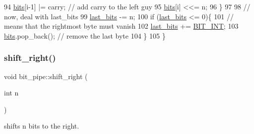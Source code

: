\begin{DoxyCode}
94       \hyperlink{classbit__pipe_a86f38af1e9736b053728033490476b50}{bits}[i-1] |= carry; \textcolor{comment}{// add carry to the left guy}
95     \hyperlink{classbit__pipe_a86f38af1e9736b053728033490476b50}{bits}[i] <<= n; 
96   \}
97 
98   \textcolor{comment}{// now, deal with last\_bits}
99   \hyperlink{classbit__pipe_a0f3e84b02751803adaab499b5dad86fe}{last\_bits} -= n;
100   \textcolor{keywordflow}{if} (\hyperlink{classbit__pipe_a0f3e84b02751803adaab499b5dad86fe}{last\_bits} <= 0)\{
101     \textcolor{comment}{// means that the rightmost byte must vanish}
102     \hyperlink{classbit__pipe_a0f3e84b02751803adaab499b5dad86fe}{last\_bits} += \hyperlink{bitstream_8h_afcadf5aa65c5159bfb96c4d82ebc0a5d}{BIT\_INT};
103     \hyperlink{classbit__pipe_a86f38af1e9736b053728033490476b50}{bits}.pop\_back(); \textcolor{comment}{// remove the last byte}
104   \}
105 \}
\end{DoxyCode}
\mbox{\label{classbit__pipe_a341a1f62d728a67f730503ca722a7770}} 
\subsubsection{\texorpdfstring{shift\+\_\+right()}{shift\_right()}}
{\footnotesize\ttfamily void bit\+\_\+pipe\+::shift\+\_\+right (\begin{DoxyParamCaption}\item[{int}]{n }\end{DoxyParamCaption})}



shifts n bits to the right. 

